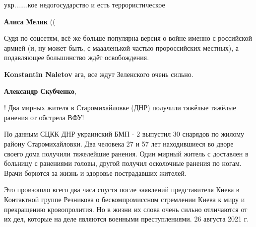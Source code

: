 \begin{itemize}
укр.......кое недогосударство и есть террористическое

\begin{itemize}
 
\textbf{Алиса Мелик} ((
\end{itemize}

 

Судя по соцсетям, всё же больше популярна версия о войне именно с российской
армией (и, ну может быть, с маааленькой частью пророссийских местных), а
подавляющее большинство ждёт освобождения.

\begin{itemize}
 
\textbf{Konstantin Naletov} ага, все ждут Зеленского очень сильно.

 
\textbf{Александр Скубченко}, 

! Два мирных жителя в Старомихайловке (ДНР) получили тяжёлые тяжёлые ранения от обстрела ВФУ!

По данным СЦКК ДНР украинский БМП - 2 выпустил 30 снарядов по жилому району
Старомихайловки. Два человека 27 и 57 лет находившиеся во дворе своего дома
получили тяжелейшие ранения. Один мирный житель с доставлен в больницу с
ранениями головы, другой получил осколочные ранения по ногам. Врачи борются за
жизнь и здоровье пострадавших жителей.

Это произошло всего два часа спустя после заявлений представителя Киева в
Контактной группе Резникова о бескомпромиссном стремлении Киева к миру и
прекращению кровопролития. Но в жизни их слова очень сильно отличаются от их
дел, которые на деле являются военными преступлениями. 26 августа 2021 г.


\end{itemize}
\end{itemize}
